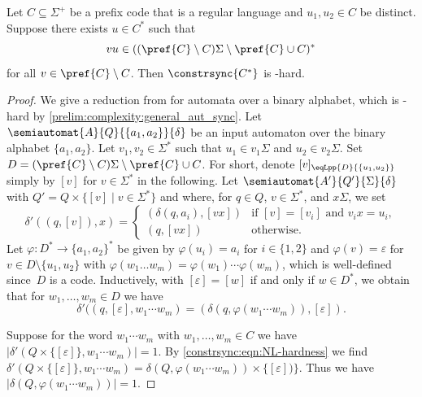 \begin{theorem} \label{constrsync:thm:NL-hardness}
	Let $C \subseteq \Sigma^+$ be a prefix code that is a regular language
	and $u_1, u_2 \in C$ be distinct.
	Suppose there exists $u \in C^*$ such that
	\[
	vu \in ( (\pref{C}\setminus C)\Sigma \setminus \pref{C} \cup C )^*	
	\]
	for all $v \in \pref{C} \setminus C$.
	Then $\constrsync{C^*}$ is \NL-hard.
\end{theorem} 
\begin{proof}
	We give a reduction from \DFAS
	for automata over a binary alphabet, which
	is \NL-hard by \cref{prelim:complexity:general_aut_sync}.
	Let $\semiautomat{A}{Q}{\{a_1, a_2\}}{\delta}$
	be an input automaton over the binary alphabet $\{a_1, a_2\}$.
	Let $v_1, v_2 \in \Sigma^*$ such that $u_1 \in v_1\Sigma$
	and $u_2 \in v_2\Sigma$.
	Set $D = (\pref{C}\setminus C)\Sigma \setminus \pref{C} \cup C$.
	For short, denote $[v]_{\eqLpp{D}{\{u_1, u_2\}}}$ 
	simply by $[v]$ for $v \in \Sigma^*$ in the following.	
	Let $\semiautomat{A'}{Q'}{\Sigma}{\delta}$
	with $Q' = Q \times \{ [v] \mid v \in \Sigma^* \}$ and
	where, for $q \in Q$, $v \in \Sigma^*$, and $x \Sigma$, we set
	\[
	\delta'((q, [v]), x)
	=
	\begin{cases}
	(\delta(q, a_i), [vx]) & \text{if } [v] = [v_i] \text{ and } v_i x = u_i, \\ 
	(q, [vx]) & \text{otherwise.}
	\end{cases}
	\]
	Let $\varphi \colon D^* \to \{a_1, a_2\}^*$
	be given by $\varphi(u_i) = a_i$ for $i \in \{1,2\}$
	and $\varphi(v) = \varepsilon$ for $v \in D \setminus \{u_1, u_2\}$
	with $\varphi(w_1 \dots w_m) = \varphi(w_1) \cdots \varphi(w_m)$,
	which is well-defined since~$D$ is a code.
	Inductively, with $[\varepsilon] = [w]$ if and only if $w \in D^*$,
	we obtain that for $w_1, \ldots, w_m \in D$
	we have
	\begin{equation}\label{constrsync:eqn:NL-hardness}
		\delta'((q, [\varepsilon], w_1 \cdots w_m) = (\delta(q, \varphi(w_1 \cdots w_m)), [\varepsilon]).
	\end{equation}	
	
	Suppose for the word $w_1 \cdots w_m$ with $w_1, \ldots, w_m \in C$
	we have $|\delta'(Q \times \{ [\varepsilon] \}, w_1 \cdots w_m)| = 1$.
	By \cref{constrsync:eqn:NL-hardness}
	we find 
	$\delta'(Q \times \{ [\varepsilon] \}, w_1 \cdots w_m) = \delta(Q, \varphi(w_1 \cdots w_m)) \times \{ [\varepsilon]) \}$.
	Thus we have $| \delta(Q, \varphi(w_1 \cdots w_m)) | = 1$.
	

\end{proof}
